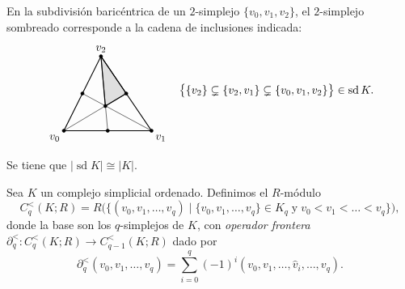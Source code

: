 \begin{ejemplo}
En la subdivisión baricéntrica de un $2$-simplejo $\{v_0, v_1, v_2\}$, el $2$-simplejo sombreado corresponde a la cadena de inclusiones indicada:
\[
\begin{tikzpicture}[baseline=(current bounding box.center), scale=1.05]
    \coordinate (V0) at (0, 0);
    \coordinate (V1) at (2.6, 0);
    \coordinate (V2) at (1.1, 2.2);

    \coordinate (M01) at (1.3, 0);
    \coordinate (M12) at (1.85, 1.1);
    \coordinate (M02) at (0.55, 1.1);

    \coordinate (B) at (1.23, 0.73);

    \fill[gray!25] (V2) -- (M12) -- (B) -- cycle;

    \draw[thin] (V0) -- (M12);
    \draw[thin] (V1) -- (M02);
    \draw[thin] (V2) -- (M01);

    \draw[thick] (V2) -- (M12) -- (B) -- cycle;

    \draw[thick] (V0) -- (V1) -- (V2) -- cycle;

    \foreach \p in {V0, V1, V2, M01, M12, M02, B} {
        \filldraw (\p) circle (1.4pt);
    }

    \node[below left] at (V0) {$v_0$};
    \node[below right] at (V1) {$v_1$};
    \node[above] at (V2) {$v_2$};
\end{tikzpicture}
\; \; \;
\big\{ \{v_2\} \subsetneq \{v_2, v_1\} \subsetneq \{v_0, v_1, v_2\} \big\} \in \operatorname{sd} K.
\]
\end{ejemplo}

\begin{nota}
Se tiene que $|\operatorname{sd} K| \cong |K|$.
\end{nota}
\begin{definicion}
Sea $K$ un complejo simplicial ordenado. Definimos el $R$-módulo
\[
C_q^<(K; R) = R\Big( \big\{ (v_0, v_1, \dots, v_q) \;\big|\; \{v_0, v_1, \dots, v_q\} \in K_q \; \text{y} \; v_0 < v_1 < \dots < v_q \big\} \Big),
\]
donde la base son los $q$-simplejos de $K$, con \textit{operador frontera} $\partial_q^< \colon C_q^<(K; R) \to C_{q-1}^<(K; R)$ dado por
\[
\partial_q^<(v_0, v_1, \dots, v_q) = \sum_{i=0}^q (-1)^i (v_0, v_1, \dots, \hat{v}_i, \dots, v_q).
\]
\end{definicion}

